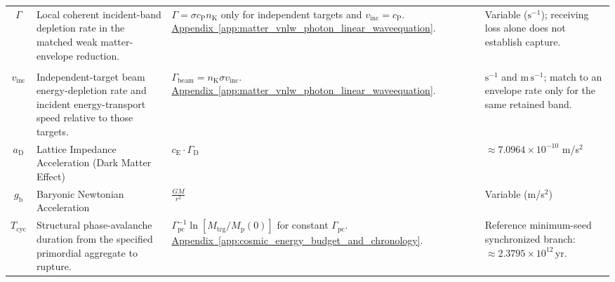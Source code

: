 \begin{longtable}{@{} c p{5.5cm} p{4cm} p{3.5cm} @{}}
$\Gamma$ & {\raggedright Local coherent incident-band depletion rate in the matched weak matter-envelope reduction.\par} & {\raggedright $\Gamma=\sigma c_{\mathrm P}n_{\mathrm K}$ only for independent targets and $v_{\mathrm{inc}}=c_{\mathrm P}$. \newline \hyperref[app:matter_vnlw_photon_linear_waveequation]{Appendix~\ref*{app:matter_vnlw_photon_linear_waveequation}}.\par} & {\raggedright Variable ($\mathrm{s^{-1}}$); receiving loss alone does not establish capture.\par} \\

\begin{tabular}[c]{@{}c@{}}$\Gamma_{\mathrm{beam}}$ \\ $v_{\mathrm{inc}}$\end{tabular} & {\raggedright Independent-target beam energy-depletion rate and incident energy-transport speed relative to those targets.\par} & {\raggedright $\Gamma_{\mathrm{beam}}=n_{\mathrm K}\sigma v_{\mathrm{inc}}$. \newline \hyperref[app:matter_vnlw_photon_linear_waveequation]{Appendix~\ref*{app:matter_vnlw_photon_linear_waveequation}}.\par} & {\raggedright $\mathrm{s^{-1}}$ and $\mathrm{m\,s^{-1}}$; match to an envelope rate only for the same retained band.\par} \\



$a_{\mathrm{D}}$ & Lattice Impedance Acceleration (Dark Matter Effect) & $c_{\mathrm{E}} \cdot \Gamma_{\mathrm{D}}$ & $\approx 7.0964 \times 10^{-10}$ m/s$^2$ \\

$g_{\mathrm{b}}$ & Baryonic Newtonian Acceleration & $\frac{GM}{r^2}$ & Variable (m/s$^2$) \\

$T_{\mathrm{cyc}}$ & {\raggedright Structural phase-avalanche duration from the specified primordial aggregate to rupture.\par} & {\raggedright $\Gamma_{\mathrm{pc}}^{-1}\ln[M_{\mathrm{trg}}/M_{\mathrm p}(0)]$ for constant $\Gamma_{\mathrm{pc}}$. \newline \hyperref[app:cosmic_energy_budget_and_chronology]{Appendix~\ref*{app:cosmic_energy_budget_and_chronology}}.\par} & {\raggedright Reference minimum-seed synchronized branch: $\approx2.3795\times10^{12}\,\mathrm{yr}$.\par} \\


\end{longtable}
